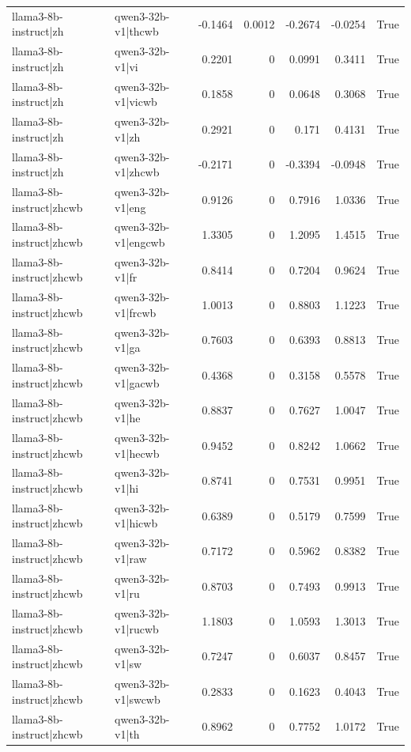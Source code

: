 \begin{table}
\begin{tabular}{l l r r r r l}
llama3-8b-instruct|zh & qwen3-32b-v1|thcwb & -0.1464 & 0.0012 & -0.2674 & -0.0254 & True \\
llama3-8b-instruct|zh & qwen3-32b-v1|vi & 0.2201 & 0 & 0.0991 & 0.3411 & True \\
llama3-8b-instruct|zh & qwen3-32b-v1|vicwb & 0.1858 & 0 & 0.0648 & 0.3068 & True \\
llama3-8b-instruct|zh & qwen3-32b-v1|zh & 0.2921 & 0 & 0.171 & 0.4131 & True \\
llama3-8b-instruct|zh & qwen3-32b-v1|zhcwb & -0.2171 & 0 & -0.3394 & -0.0948 & True \\
llama3-8b-instruct|zhcwb & qwen3-32b-v1|eng & 0.9126 & 0 & 0.7916 & 1.0336 & True \\
llama3-8b-instruct|zhcwb & qwen3-32b-v1|engcwb & 1.3305 & 0 & 1.2095 & 1.4515 & True \\
llama3-8b-instruct|zhcwb & qwen3-32b-v1|fr & 0.8414 & 0 & 0.7204 & 0.9624 & True \\
llama3-8b-instruct|zhcwb & qwen3-32b-v1|frcwb & 1.0013 & 0 & 0.8803 & 1.1223 & True \\
llama3-8b-instruct|zhcwb & qwen3-32b-v1|ga & 0.7603 & 0 & 0.6393 & 0.8813 & True \\
llama3-8b-instruct|zhcwb & qwen3-32b-v1|gacwb & 0.4368 & 0 & 0.3158 & 0.5578 & True \\
llama3-8b-instruct|zhcwb & qwen3-32b-v1|he & 0.8837 & 0 & 0.7627 & 1.0047 & True \\
llama3-8b-instruct|zhcwb & qwen3-32b-v1|hecwb & 0.9452 & 0 & 0.8242 & 1.0662 & True \\
llama3-8b-instruct|zhcwb & qwen3-32b-v1|hi & 0.8741 & 0 & 0.7531 & 0.9951 & True \\
llama3-8b-instruct|zhcwb & qwen3-32b-v1|hicwb & 0.6389 & 0 & 0.5179 & 0.7599 & True \\
llama3-8b-instruct|zhcwb & qwen3-32b-v1|raw & 0.7172 & 0 & 0.5962 & 0.8382 & True \\
llama3-8b-instruct|zhcwb & qwen3-32b-v1|ru & 0.8703 & 0 & 0.7493 & 0.9913 & True \\
llama3-8b-instruct|zhcwb & qwen3-32b-v1|rucwb & 1.1803 & 0 & 1.0593 & 1.3013 & True \\
llama3-8b-instruct|zhcwb & qwen3-32b-v1|sw & 0.7247 & 0 & 0.6037 & 0.8457 & True \\
llama3-8b-instruct|zhcwb & qwen3-32b-v1|swcwb & 0.2833 & 0 & 0.1623 & 0.4043 & True \\
llama3-8b-instruct|zhcwb & qwen3-32b-v1|th & 0.8962 & 0 & 0.7752 & 1.0172 & True \\

\end{tabular}
\end{table}
